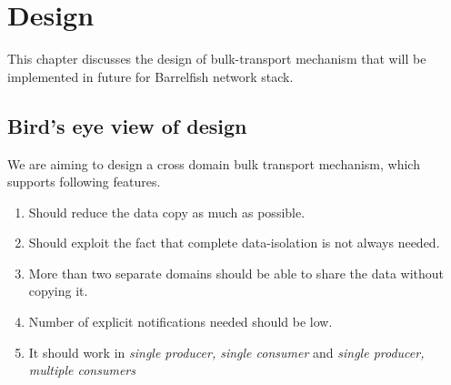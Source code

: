 \documentclass[a4paper,twoside]{report} %
\begin{document}
\chapter{Design}
\label{chap:design}
This chapter discusses the design of bulk-transport mechanism 
that will be implemented in future for Barrelfish network
stack.


\section{Bird's eye view of design}
We are aiming to design a cross domain bulk transport mechanism,
which supports following features.
\begin{enumerate}
  \item Should reduce the data copy as much as possible.
  \item Should exploit the fact that complete data-isolation
  is not always needed.
  \item More than two separate domains should be able to share
  the data without copying it.
  \item Number of explicit notifications needed should be low.
  \item It should work in \textit{single producer, single consumer}
  and \textit{single producer, multiple consumers}
\end{enumerate}
\end{document}
